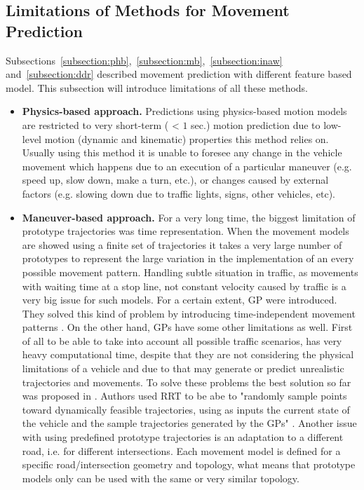 \subsection{Limitations of Methods for Movement Prediction}

Subsections~\ref{subsection:phb},~\ref{subsection:mb},~\ref{subsection:inaw} and~\ref{subsection:ddr} described movement prediction with different feature based model. This subsection will introduce limitations of all these methods.

\begin{itemize}
	\item \textbf{Physics-based approach.} Predictions using physics-based motion models are restricted to very short-term ( < $1$ sec.) motion prediction due to low-level motion (dynamic and kinematic) properties this method relies on. Usually using this method it is  unable to foresee any change in the vehicle movement which happens due to an execution of a particular maneuver (e.g. speed up, slow down, make a turn, etc.), or changes caused by external factors (e.g. slowing down due to traffic lights, signs, other vehicles, etc).
	
	\item \textbf{Maneuver-based approach.} For a very long time, the biggest limitation of prototype trajectories was time representation. When the movement models are showed using a finite set of trajectories it takes a very large number of prototypes to represent the large variation
	in the implementation of an every possible movement pattern. Handling subtle situation in traffic, as movements with waiting time at a stop line, not constant velocity caused by traffic is a very big issue for such models. For a certain extent, \gls{GP} were introduced. They solved this kind of problem by introducing time-independent movement patterns \cite{DataDrivenIII}. On the other hand, \glspl{GP} have some other limitations as well. First of all to be able to take into account all possible traffic scenarios, has very heavy computational time, despite that they are not considering the physical limitations of a vehicle and due to that may generate or predict unrealistic trajectories and movements. To solve these problems the best solution so far was proposed in \cite{RRT}. Authors used \gls{RRT} to be abe to "randomly sample points toward dynamically feasible trajectories, using as inputs the current state of the vehicle and the sample trajectories generated by the \glspl{GP}"  \cite{RRT}. Another issue with using predefined prototype trajectories is an adaptation to a different road, i.e. for different intersections. Each movement model is defined for a specific road/intersection geometry and topology, what means that prototype models only can be used with the same or very similar topology. 
	

\end{itemize}
